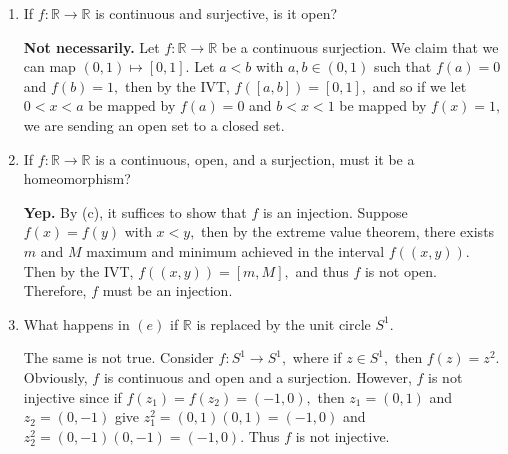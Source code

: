 \documentclass[11pt]{article}
\newcommand{\bbR}{\mathbb{R}}
\begin{document}
\begin{enumerate}
\begin{solution}
    \end{solution}
    \item 
    \begin{problem}
        If $f: \bbR \to \bbR$ is continuous and surjective, is it open?
    \end{problem}
    \begin{solution}
        \textbf{Not necessarily.} Let $f:\bbR \to \bbR$ be a continuous surjection. We claim that we can map $(0,1) \mapsto [0,1]$. Let $a<b$ with $a,b\in (0,1)$ such that $f(a) = 0$ and $f(b) = 1,$ then by the IVT, $f([a,b]) = [0,1],$ and so if we let $0<x<a$ be mapped by $f(a) = 0$ and $b<x<1$ be mapped by $f(x) = 1,$ we are sending an open set to a closed set.
    \end{solution}
    \item 
    \begin{problem}
        If $f: \bbR \to \bbR$ is a continuous, open, and a surjection, must it be a homeomorphism?
    \end{problem}
    \begin{solution}
        \textbf{Yep.} By (c), it suffices to show that $f$ is an injection. Suppose $f(x) = f(y)$ with $x<y,$ then by the extreme value theorem, there exists $m$ and $M$ maximum and minimum achieved in the interval $f((x,y)).$ Then by the IVT, $f((x,y)) = [m,M],$ and thus $f$ is not open. Therefore, $f$ must be an injection.
    \end{solution}
    \item 
    \begin{problem}
        What happens in $(e)$ if $\bbR$ is replaced by the unit circle $S^1.$ 
    \end{problem}
    \begin{solution}
    The same is not true. Consider $f: S^1 \to S^1,$ where if $z\in S^1,$ then $f(z) = z^2.$ Obviously, $f$ is continuous and open and a surjection. However, $f$ is not injective since if $f(z_1) = f(z_2) = (-1,0),$ then $z_1 = (0,1)$ and $z_2 = (0,-1)$ give $z_1^2 = (0,1)(0,1) = (-1, 0)$ and $z_2^2 = (0,-1)(0,-1) = (-1,0).$ Thus $f$ is not injective.    
    \end{solution}
    \end{enumerate}
    
\newpage
\end{document}
